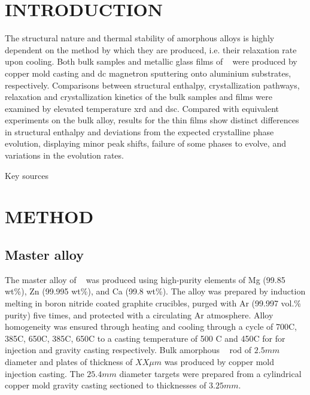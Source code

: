 \documentclass[a4paper,12pt,oneside]{article}%
\begin{document}
\newpage
\tableofcontents\newpage
{}
\clearpage %


\section{INTRODUCTION}
\glsresetall

The structural nature and thermal stability of amorphous alloys is highly dependent on the method by which they are produced, i.e. their relaxation rate upon cooling.  Both bulk samples and metallic glass films of \MgZnCa~ were produced by copper mold casting and \gls{dc} magnetron sputtering onto aluminium substrates, respectively. Comparisons between structural enthalpy, crystallization pathways, relaxation and crystallization kinetics of the bulk samples and films were examined by elevated temperature \acrshort{xrd} and \acrshort{dsc}. Compared with equivalent experiments on the bulk alloy, results for the thin films show distinct differences in structural enthalpy and deviations from the expected crystalline phase evolution, displaying minor peak shifts, failure of some phases to evolve, and variations in the evolution rates. 

Key sources \cite{Zhang2013, Zhang2012} 
\cite{Zhang2011}


\section{METHOD}

\subsection{Master alloy}
The master alloy of \MgZnCa~ was produced using high-purity elements of Mg (99.85 wt\%), Zn (99.995 wt\%), and Ca (99.8 wt\%). The alloy was prepared by induction melting in boron nitride coated graphite crucibles, purged with Ar (99.997 vol.\% purity) five times, and protected with a circulating Ar atmosphere. Alloy homogeneity was ensured through heating and cooling through a cycle of 700\degree C, 385\degree C, 650\degree C, 385\degree C, 650\degree C to a casting temperature of 500 \degree C and 450\degree C for for injection and gravity casting respectively. Bulk amorphous \MgZnCa~ rod of $2.5 mm$ diameter and plates of thickness of $XX \mu m$ was produced by copper mold injection casting. The $25.4 mm$ diameter targets were prepared from a cylindrical copper mold gravity casting sectioned to thicknesses of $3.25 mm$.
\end{document}
